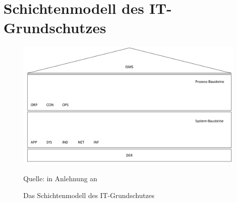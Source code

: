 \section{Schichtenmodell des IT-Grundschutzes}
\begin{figure}[H]
	\centering
	\includegraphics[scale=0.45]{img/bsiSchichtenmodell.pdf}
	\caption{Das Schichtenmodell des IT-Grundschutzes}
	{\footnotesize Quelle: in Anlehnung an \cite[][S.9]{bundesamt_fur_sicherheit_in_der_informationstechnik_bsi_it-grundschutz-kompendium_2020}}
	\label{abb:BSISchichtenmodell}
\end{figure}

